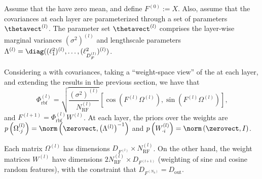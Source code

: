 Assume that the  have zero mean, and define $F^{(0)} := X$.
Also, assume that the \gp covariances at each layer are parameterized through a set of parameters $\thetavect^{(l)}$.
The parameter set $\thetavect^{(l)}$ comprises the layer-wise \gp marginal variances $(\sigma^2)^{(l)}$ and lengthscale parameters 
$\Lambda^{(l)} = \diag((\ell_1^2)^{(l)}, \ldots, (\ell_{D_F^{(l)}}^2)^{(l)})$. 

Considering a \dgp with \rbf covariances,  taking a ``weight-space view'' of the  at each layer, and extending the results in the previous section, we have that
\begin{equation}
\Phi_{\mathrm{rbf}}^{(l)} = \sqrt{\frac{(\sigma^2)^{(l)}}{N_{\mathrm{RF}}^{(l)}}} \left[ \cos\left(F^{(l)} \Omega^{(l)}\right), \sin\left(F^{(l)} \Omega^{(l)}\right) \right] \text{,}
\end{equation}
and 
$
F^{(l+1)} = \Phi_{\mathrm{rbf}}^{(l)} W^{(l)} %
$.
At each layer, the priors over the weights are
$
p\left(\Omega^{(l)}_{\cdot j}\right) = \norm\left(\zerovect, \left(\Lambda^{(l)}\right)^{-1} \right) %
$
and
$
p\left(W^{(l)}_{\cdot i}\right) = \norm\left(\zerovect, I \right) %
$.

Each matrix $\Omega^{(l)}$ has dimensions $D_{F^{(l)}} \times N_{\mathrm{RF}}^{(l)}$. 
On the other hand, the weight matrices $W^{(l)}$ have dimensions $2N_{\mathrm{RF}}^{(l)} \times D_{F^{(l+1)}}$ (weighting of sine and cosine random features), with the constraint that $D_{F^{(N_{\mathrm{h}})}} = D_{\mathrm{out}}$.

